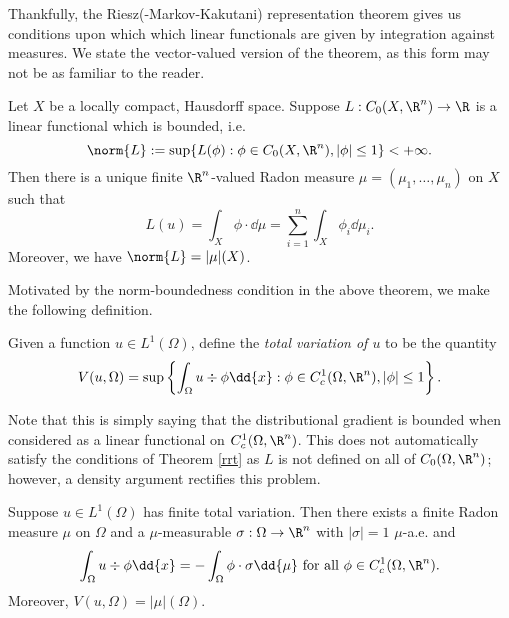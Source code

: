 \documentclass[../main.tex]{subfiles}
\begin{document}
Thankfully, the Riesz(-Markov-Kakutani) representation theorem gives us conditions upon which which linear functionals are given by integration against measures. We state the vector-valued version of the theorem, as this form may not be as familiar to the reader. 
\begin{theorem}\label{rrt}
    Let $ X $ be a locally compact, Hausdorff space. Suppose $ L: C_{0}(X,\R^{n})\to \R $ is a linear functional which is bounded, i.e. 
    \[
        \norm{L}:= \sup\{L(\phi) : \phi\in C_{0}(X,\R^{n}), | \phi|\leq 1\} < +\infty.
    \]
    Then there is a unique finite $ \R^{n} $-valued Radon measure $ \mu = (\mu_{1},\ldots, \mu_{n}) $ on $ X $ such that 
    \[
        L(u) = \int_{X} \phi\cdot \dd{\mu} = \sum_{i=1}^{n}\int_{X} \phi_{i} \dd{\mu_{i}}.
    \]
    Moreover, we have $ \norm{L} = | \mu|(X) $.
\end{theorem}
Motivated by the norm-boundedness condition in the above theorem, we make the following definition.
\begin{definition}Given a function $ u\in L^{1}(\Omega) $, define the \textit{total variation of $ u $} to be the quantity
    \[
        V(u,\Omega) = \sup\left\{ \int_{\Omega} u\div{\phi}\dd{x} : \phi\in C_{c}^{1}(\Omega,\R^{n}), | \phi| \leq 1 \right\}.
    \]
\end{definition}
Note that this is simply saying that the  distributional gradient is bounded when considered as a linear functional on $ C_{c}^{1}(\Omega,\R^{n}) $. This does not automatically satisfy the conditions of Theorem \ref{rrt} as $ L $ is not defined on all of $ C_{0}(\Omega,\R^{n}) $; however, a density argument rectifies this problem.

\begin{proposition}[Characterization of $ BV $]\label{bvchar}
    Suppose $ u\in L^{1}(\Omega) $ has finite total variation. Then there exists a finite Radon measure $ \mu $ on $ \Omega $ and a $ \mu $-measurable $ \sigma:\Omega\to \R^{n} $ with $ | \sigma| = 1$ $ \mu $-a.e. and
    \[
        \int_{\Omega} u\div{\phi}\dd{x} = -\int_{\Omega} \phi\cdot \sigma \dd{\mu} \text{ for all } \phi\in C_{c}^{1}(\Omega,\R^{n}).
    \]
    Moreover, $ V(u,\Omega) = | \mu|(\Omega) $.
\end{proposition}
\end{document}
